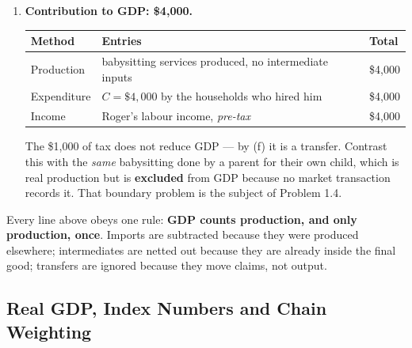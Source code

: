 \documentclass[12pt, letterpaper]{article}
\begin{document}
\begin{tcolorbox}[oddbox,title={Problem 1.1 \quad Accounting}]
\begin{enumerate}
\item \textbf{Contribution to GDP: \$4,000.}

\begin{center}
\begin{tabular}{lll}
\toprule
\textbf{Method} & \textbf{Entries} & \textbf{Total} \\
\midrule
Production  & babysitting services produced, no intermediate inputs & \$4,000 \\
Expenditure & $C = \$4{,}000$ by the households who hired him & \$4,000 \\
Income      & Roger's labour income, \emph{pre-tax} & \$4,000 \\
\bottomrule
\end{tabular}
\end{center}

The \$1,000 of tax does not reduce GDP --- by (f) it is a transfer. Contrast this with the
\emph{same} babysitting done by a parent for their own child, which is real production but
is \textbf{excluded} from GDP because no market transaction records it. That boundary
problem is the subject of Problem 1.4.

\end{enumerate}

\begin{tcolorbox}[theorybox,title={Takeaway}]
Every line above obeys one rule: \textbf{GDP counts production, and only production, once}.
Imports are subtracted because they were produced elsewhere; intermediates are netted out
because they are already inside the final good; transfers are ignored because they move
claims, not output.
\end{tcolorbox}
\end{tcolorbox}

\subsection{Real GDP, Index Numbers and Chain Weighting}
\end{document}

